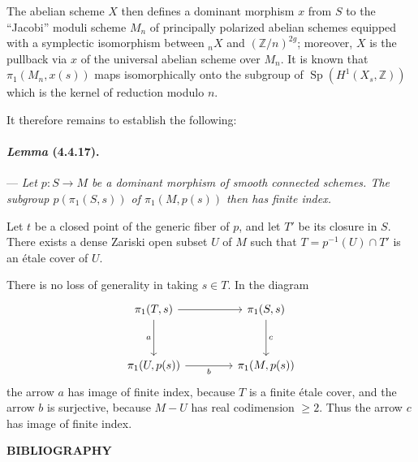 \documentclass[10pt]{article}
\newcommand{\Z}{\mathbb Z}
\providecommand{\Sp}{\operatorname{Sp}}
\begin{document}
The abelian scheme $X$ then defines a dominant morphism $x$ from $S$ to the ``Jacobi'' moduli scheme $M_n$ of principally polarized abelian schemes equipped with a symplectic isomorphism between ${}_nX$ and $(\Z/n)^{2g}$; moreover, $X$ is the pullback via $x$ of the universal abelian scheme over $M_n$. It is known that $\pi_1(M_n,x(s))$ maps isomorphically
onto the subgroup of $\Sp(H^1(X_s,\Z))$ which is the kernel of reduction modulo $n$.

It therefore remains to establish the following:

\paragraph{\emph{Lemma} (4.4.17).} --- {\itshape Let $p:S\to M$ be a dominant morphism of smooth connected schemes. The subgroup $p(\pi_1(S,s))$ of $\pi_1(M,p(s))$ then has finite index.}

Let $t$ be a closed point of the generic fiber of $p$, and let $T'$ be its closure in $S$. There exists a dense Zariski open subset $U$ of $M$ such that $T=p^{-1}(U)\cap T'$ is an étale cover of $U$.

There is no loss of generality in taking $s\in T$. In the diagram
\[
\begin{tikzcd}[column sep=4.2em,row sep=3.2em]
\pi_1(T,s) \arrow[r] \arrow[d,"a"'] & \pi_1(S,s) \arrow[d,"c"]\\
\pi_1(U,p(s)) \arrow[r,"b"'] & \pi_1(M,p(s))
\end{tikzcd}
\]
the arrow $a$ has image of finite index, because $T$ is a finite étale cover, and the arrow $b$ is surjective, because $M-U$ has real codimension $\ge2$. Thus the arrow $c$ has image of finite index.

\begin{center}
\bfseries BIBLIOGRAPHY
\end{center}
\end{document}
